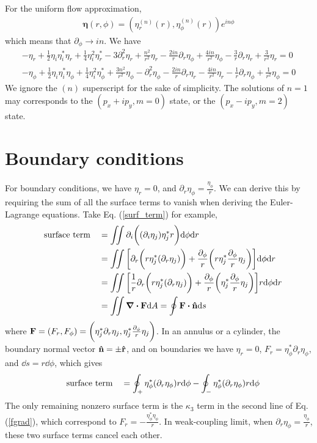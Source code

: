 \documentclass[aps,prl,preprint]{revtex4-2}
\begin{document}
For the uniform flow approximation,
\begin{align}
    \bm{\eta}(r, \phi) = \left(\eta_r^{(n)}(r), \eta_\phi^{(n)}(r)\right) e^{in\phi}
\end{align}
which means that $\partial_\phi \rightarrow in$. We have
\begin{align}
    -\eta_r+\frac{1}{2}\eta_i\eta_i^*\eta_r
    +\frac{1}{4}\eta_i^2\eta_r^*
    -3\partial_r^2\eta_r + \frac{n^2}{r^2}\eta_r
    -\frac{2in}{r}\partial_r\eta_\phi
    +\frac{4in}{r^2}\eta_\phi
    -\frac{3}{r}\partial_r\eta_r + \frac{3}{r^2}\eta_r=0 \nonumber \\
    -\eta_\phi+\frac{1}{2}\eta_i\eta_i^*\eta_\phi
    +\frac{1}{4}\eta_i^2\eta_\phi^*
    +\frac{3n^2}{r^2}\eta_\phi
    -\partial_r^2\eta_\phi
    -\frac{2in}{r}\partial_r\eta_r
    -\frac{4in}{r^2}\eta_r
    -\frac{1}{r}\partial_r\eta_\phi
    +\frac{1}{r^2}\eta_\phi=0\nonumber
\end{align}
We ignore the $(n)$ superscript for the sake of simplicity.
The solutions of $n=1$ may corresponds to the
$(p_x + ip_y, m=0)$ state, or the $(p_x - ip_y, m=2)$ state.

\section{Boundary conditions}
For boundary conditions, we have $\eta_r = 0$, and $\partial_r\eta_\phi = \frac{\eta_\phi}{r}$.
We can derive this by requiring the sum of all the surface terms to vanish
when deriving the Euler-Lagrange equations. Take Eq. (\ref{surf_term}) for example,
\begin{align}
    \qq{surface term}
     & = \iint\partial_i\bigg((\partial_i\eta_j)\eta_j^* r\bigg)\dd\phi\dd r                      \\
     & = \iint\bigg[\partial_r\bigg(r\eta_j^*(\partial_r\eta_j)\bigg)
    + \frac{\partial_\phi}{r}\bigg(r\eta_j^*\frac{\partial_\phi}{r}\eta_j\bigg)\bigg]\dd\phi\dd r \\
     & = \iint\bigg[\frac{1}{r}\partial_r\bigg(r\eta_j^*(\partial_r\eta_j)\bigg)
    + \frac{\partial_\phi}{r}\bigg(\eta_j^*\frac{\partial_\phi}{r}\eta_j\bigg)\bigg]r\dd\phi\dd r \\
     & =\iint\div\vb{F}\dd A  = \oint \vb{F} \vdot \vu{n} \dd s
\end{align}
where $\vb{F} = (F_r, F_\phi) = \bigg(\eta_j^*\partial_r\eta_j, \eta_j^*\frac{\partial_\phi}{r}\eta_j\bigg)$.
In an annulus or a cylinder, the boundary normal vector $\vu{n}=\pm\vu{r}$, and
on boundaries we have $\eta_r=0$, $F_r=\eta_\phi^*\partial_r\eta_\phi$, and $\dd s=r\dd\phi$, which gives
\begin{align}
    \qq{surface term} = \oint_+ \eta_\phi^*(\partial_r\eta_\phi) r\dd\phi
    - \oint_- \eta_\phi^*(\partial_r\eta_\phi) r\dd\phi
\end{align}
The only remaining nonzero surface term is the $\kappa_3$ term in the second line of Eq. (\ref{fgrad}),
which correspond to $F_r = -\frac{\eta_\phi^*\eta_\phi}{r}$. In weak-coupling limit,
when $\partial_r\eta_\phi = \frac{\eta_\phi}{r}$, these two surface terms cancel each other.
\end{document}
